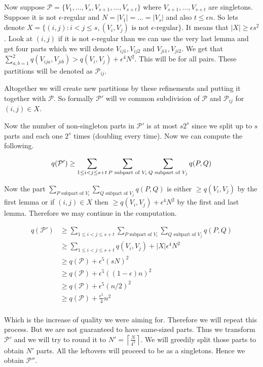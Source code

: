 Now suppose $\mathcal{P} = \{V_1, \dots, V_s, V_{s+1}, \dots, V_{s+t}\}$ where $V_{s+1}, \dots, V_{s+t}$ are singletons. Suppose it is not $\epsilon$-regular and $N = |V_1| = \dots = |V_s|$ and also $t \leq \epsilon n$. So lets denote $X = \{(i,j) : i < j \leq s, (V_i, V_j) \text{ is not } \epsilon\text{-regular}\}$. It means that $|X| \geq \epsilon s^2$. Look at $(i,j)$ if it is not $\epsilon$-regular than we can use the very last lemma and get four parts which we will denote $V_{ij1}, V_{ij2}$ and $V_{ji1}, V_{ji2}$. We get that $\sum_{a,b = 1}^2 q(V_{ija}, V_{jib}) > q(V_i, V_j) + \epsilon^4 N^2$. This will be for all pairs. These partitions will be denoted as $\mathcal{P}_{ij}$.

Altogether we will create new partitions by these refinements and putting it together with $\mathcal{P}$. So formally $\mathcal{P}'$ will ve common subdivision of $\mathcal{P}$ and $\mathcal{P}_{ij}$ for $(i,j) \in X$.

Now the number of non-singleton parts in $\mathcal{P}'$ is at most $s2^s$ since we split up to $s$ parts and each one $2^s$ times (doubling every time). Now we can compute the following.

$$
q(\mathcal{P}') \geq \sum_{1 \leq i < j \leq s + t} \sum_{P \text{ subpart of } V_i} \sum_{Q \text{ subpart of } V_j} q(P,Q)\\
$$

Now the part $\sum_{P \text{ subpart of } V_i} \sum_{Q \text{ subpart of } V_j} q(P,Q)$ is either $\geq q(V_i, V_j)$ by the first lemma or if $(i,j) \in X$ then $\geq q(V_i, V_j) + \epsilon^4 N^2$ by the first and last lemma. Therefore we may continue in the computation.

$$
\begin{aligned}
	q(\mathcal{P}') &\geq \sum_{1 \leq i < j \leq s + t} \sum_{P \text{ subpart of } V_i} \sum_{Q \text{ subpart of } V_j} q(P,Q)\\
	&\geq \sum_{1 \leq i < j \leq s +t} q(V_i, V_j) + |X| \epsilon^4 N^2\\
	&\geq q(\mathcal{P}) + \epsilon^5 (sN)^2\\
	&\geq q(\mathcal{P}) + \epsilon^5 ((1-\epsilon)n)^2\\
	&\geq q(\mathcal{P}) + \epsilon^5 (n/2)^2\\
	&\geq q(\mathcal{P}) + \frac{\epsilon^5}{4} n^2\\
\end{aligned}
$$

Which is the increase of quality we were aiming for. Therefore we will repeat this process. But we are not guaranteed to have same-sized parts. Thus we transform $\mathcal{P}'$ and we will try to round it to $N' = \left\lceil \frac{N}{4^2} \right\rceil$. We will greedily split those parts to obtain $N'$ parts. All the leftovers will proceed to be as a singletons. Hence we obtain $\mathcal{P}''$.

